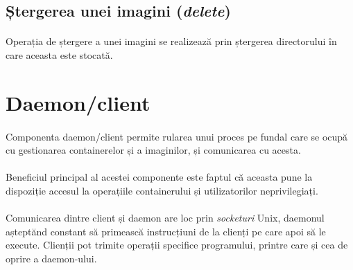         \subsection{Ștergerea unei imagini (\textit{delete})}
        \paragraph{} Operația de ștergere a unei imagini se realizează prin ștergerea directorului în care aceasta este stocată.

    \section{Daemon/client}
        \paragraph{} Componenta daemon/client permite rularea unui proces pe fundal care se ocupă cu gestionarea containerelor și a imaginilor, și comunicarea cu acesta.
        \paragraph{} Beneficiul principal al acestei componente este faptul că aceasta pune la dispoziție accesul la operațiile containerului și utilizatorilor neprivilegiați.
        \paragraph{} Comunicarea dintre client și daemon are loc prin \textit{socketuri} Unix, daemonul așteptănd constant să primească instrucțiuni de la clienți pe care apoi să le execute. Clienții pot trimite operații specifice programului, printre care și cea de oprire a daemon-ului.


